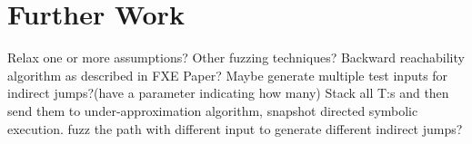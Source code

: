 \documentclass{kththesis}
\begin{document}
\section{Further Work}
Relax one or more assumptions?
Other fuzzing techniques?
Backward reachability algorithm as described in FXE Paper?
Maybe generate multiple test inputs for indirect jumps?(have a parameter indicating how many)
Stack all T:s and then send them to under-approximation algorithm, snapshot directed symbolic execution.
fuzz the path with different input to generate different indirect jumps? 

\printbibliography[heading=bibintoc]



\tailmatter
\end{document}
